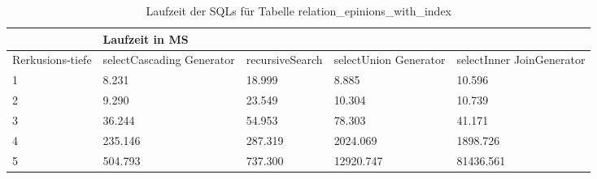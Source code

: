 \begin{table}[H]
	\centering
	\begin{tabular}{l|l|l|l|l|l|}
		\cline{2-6}
		& \multicolumn{5}{|l|}{Laufzeit in MS}                                                                                                                                                  \\ \hline
		\multicolumn{1}{|l|}{\multirow{2}{2cm}{Rerkusions-tiefe}} & \multicolumn{2}{|l|}{\multirow{2}{3cm}{selectCascading Generator}} & \multirow{2}{2.8cm}{recursiveSearch} & \multirow{2}{2.5cm}{selectUnion Generator} & \multirow{2}{2.5cm}{selectInner JoinGenerator} \\
		\multicolumn{1}{|l|}{}
		& \multicolumn{2}{|l|}{}                                           &                                  &                                     &                                           \\ \hline
		
		
\multicolumn{1}{|l|}{1}                                 & \multicolumn{2}{l|}{8.231}                                       & 18.999                                                & 8.885                                                     & 10.596                                                          \\ \hline
\multicolumn{1}{|l|}{2}                                 & \multicolumn{2}{l|}{9.290}                                       & 23.549                                                & 10.304                                                    & 10.739                                                          \\ \hline
\multicolumn{1}{|l|}{3}                                 & \multicolumn{2}{l|}{36.244}                                      & 54.953                                                & 78.303                                                    & 41.171                                                          \\ \hline
\multicolumn{1}{|l|}{4}                                 & \multicolumn{2}{l|}{235.146}                                     & 287.319                                               & 2024.069                                                  & 1898.726                                                        \\ \hline
\multicolumn{1}{|l|}{5}                                 & \multicolumn{2}{l|}{504.793}                                     & 737.300                                               & 12920.747                                                 & 81436.561                                                       \\ \hline

	\end{tabular}
	\caption{Laufzeit der SQLs für Tabelle relation\_epinions\_with\_index}
\end{table}

